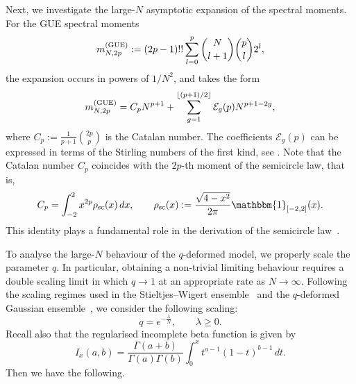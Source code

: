 \documentclass{amsart}
\theoremstyle{plain}
\theoremstyle{remark}
\numberwithin{equation}{section}
\begin{document}
Next, we investigate the large-\( N \) asymptotic expansion of the spectral moments. For the GUE spectral moments
\begin{equation}  \label{def of GUE moments}
 m_{N,2p}^{ \rm (GUE) }:= (2p-1)!! \sum_{ l=0 }^p \binom{N}{l+1}\binom{p}{l} 2^l ,
\end{equation}
the expansion occurs in powers of \( 1/N^2 \), and takes the form
\begin{equation} 
m_{N,2p}^{ \rm (GUE) }  =   C_p N^{p+1} + \sum_{g=1}^{\lfloor (p+1)/2 \rfloor}  \mathcal{E}_g(p)  N^{p+1-2g}, 
\end{equation}
where \( C_p := \frac{1}{p+1} \binom{2p}{p} \) is the Catalan number. The coefficients \( \mathcal{E}_g(p) \) can be expressed in terms of the Stirling numbers of the first kind, see \cite[Eq.~(1.27)]{BFO24}. Note that the Catalan number $C_p$ coincides with the $2p$-th moment of the semicircle law, that is,
\begin{equation} \label{def of semi-circle}
C_p = \int_{-2}^2 x^{2p} \rho_{\mathrm{sc}}(x)\,dx, \qquad \rho_{\mathrm{sc}}(x) := \frac{\sqrt{4 - x^2}}{2\pi} \mathbbm{1}_{[-2,2]}(x).
\end{equation}
This identity plays a fundamental role in the derivation of the semicircle law~\cite{Wi55}.


To analyse the large-$N$ behaviour of the $q$-deformed model, we properly scale the parameter $q$. In particular, obtaining a non-trivial limiting behaviour requires a double scaling limit in which $q \to 1$ at an appropriate rate as $N \to \infty$. Following the scaling regimes used in the Stieltjes--Wigert ensemble~\cite{Fo21} and the $q$-deformed Gaussian ensemble~\cite{BFO24}, we consider the following scaling:
\begin{equation} \label{def of q scaling}
    q=e^{-\frac{\lambda}{N}}, \qquad \lambda\geq0.
\end{equation} 
Recall also that the regularised incomplete beta function is given by 
\begin{equation} \label{def of beta ftn}
I_x(a,b)=  \frac{ \Gamma(a+b) }{ \Gamma(a)\Gamma(b) } \int_0^x t^{a-1} (1-t)^{b-1}\,dt.
\end{equation}
Then we have the following. 
 
\end{document}

